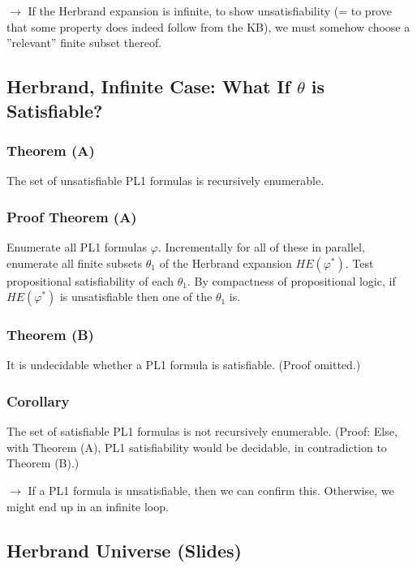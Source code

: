 \documentclass[conference, a4paper]{styles/acmsiggraph}
\begin{document}
        $\rightarrow$ If the Herbrand expansion is infinite, to show unsatisfiability (= to prove that some property does indeed follow from the KB), we must somehow choose a ''relevant'' finite subset thereof.
        
        
    \subsection{Herbrand, Infinite Case: What If $\theta$ is Satisfiable?}
        \subsubsection{Theorem (A)}
            The set of unsatisfiable PL1 formulas is recursively enumerable.
        
        \subsubsection{Proof Theorem (A)}
            Enumerate all PL1 formulas $\varphi$. 
            Incrementally for all of these in parallel, enumerate all finite subsets $\theta_1$ of the Herbrand expansion $HE(\varphi^*)$.
            Test propositional satisfiability of each $\theta_1$. 
            By compactness of propositional logic, if $HE(\varphi^*)$ is unsatisfiable then one of the $\theta_1$ is.
        
        \subsubsection{Theorem (B)}
            It is undecidable whether a PL1 formula is satisfiable. (Proof omitted.)
        
        \subsubsection{Corollary}
            The set of satisfiable PL1 formulas is not recursively enumerable. 
            (Proof: Else, with Theorem (A), PL1 satisfiability would be decidable, in contradiction to Theorem (B).)
        
        $\rightarrow$ If a PL1 formula is unsatisfiable, then we can confirm this. 
            Otherwise, we might end up in an infinite loop.
    
    \subsection{Herbrand Universe (Slides)}
\end{document}
